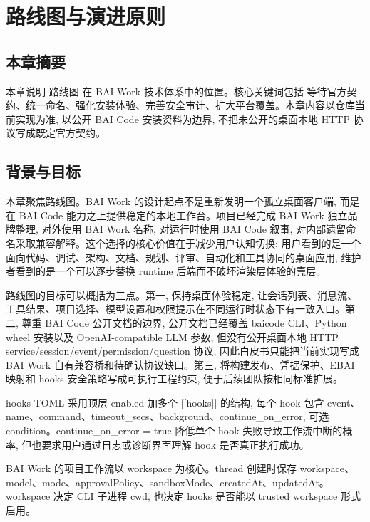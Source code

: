 \chapter{路线图与演进原则}
\section{本章摘要}
本章说明 路线图 在 BAI Work 技术体系中的位置。核心关键词包括 等待官方契约、统一命名、强化安装体验、完善安全审计、扩大平台覆盖。本章内容以仓库当前实现为准, 以公开 BAI Code 安装资料为边界, 不把未公开的桌面本地 HTTP 协议写成既定官方契约。

\section{背景与目标}
本章聚焦路线图。BAI Work 的设计起点不是重新发明一个孤立桌面客户端, 而是在 BAI Code 能力之上提供稳定的本地工作台。项目已经完成 BAI Work 独立品牌整理, 对外使用 BAI Work 名称, 对运行时使用 BAI Code 叙事, 对内部遗留命名采取兼容解释。这个选择的核心价值在于减少用户认知切换: 用户看到的是一个面向代码、调试、架构、文档、规划、评审、自动化和工具协同的桌面应用, 维护者看到的是一个可以逐步替换 runtime 后端而不破坏渲染层体验的壳层。

路线图的目标可以概括为三点。第一, 保持桌面体验稳定, 让会话列表、消息流、工具结果、项目选择、模型设置和权限提示在不同运行时状态下有一致入口。第二, 尊重 BAI Code 公开文档的边界, 公开文档已经覆盖 baicode CLI、Python wheel 安装以及 OpenAI-compatible LLM 参数, 但没有公开桌面本地 HTTP service/session/event/permission/question 协议, 因此白皮书只能把当前实现写成 BAI Work 自有兼容桥和待确认协议缺口。第三, 将构建发布、凭据保护、EBAI 映射和 hooks 安全策略写成可执行工程约束, 便于后续团队按相同标准扩展。

hooks TOML 采用顶层 enabled 加多个 [[hooks]] 的结构, 每个 hook 包含 event、name、command、timeout\_secs、background、continue\_on\_error, 可选 condition。continue\_on\_error = true 降低单个 hook 失败导致工作流中断的概率, 但也要求用户通过日志或诊断界面理解 hook 是否真正执行成功。

BAI Work 的项目工作流以 workspace 为核心。thread 创建时保存 workspace、model、mode、approvalPolicy、sandboxMode、createdAt、updatedAt。workspace 决定 CLI 子进程 cwd, 也决定 hooks 是否能以 trusted workspace 形式启用。

